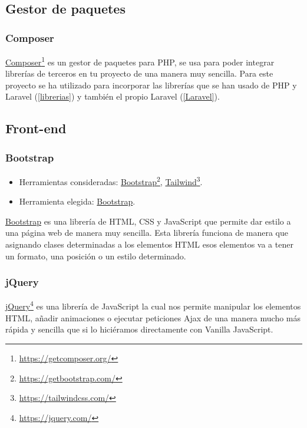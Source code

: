 \subsection{Gestor de paquetes}

\subsubsection{Composer}

\href{https://getcomposer.org/}{Composer}\footnote{\href{https://getcomposer.org/}{https://getcomposer.org/}} es un gestor de paquetes para PHP, se usa para poder integrar librerías de terceros en tu proyecto de una manera muy sencilla. Para este proyecto se ha utilizado para incorporar las librerías que se han usado de PHP y Laravel (\ref{librerias}) y también el propio Laravel (\ref{Laravel}).

\subsection{Front-end}

\subsubsection{Bootstrap}
\begin{itemize}
    \item Herramientas consideradas: \href{https://getbootstrap.com/}{Bootstrap}\footnote{\label{bootstrapfoot}\href{https://getbootstrap.com/}{https://getbootstrap.com/}}, \href{https://tailwindcss.com/}{Tailwind}\footnote{\href{https://tailwindcss.com/}{https://tailwindcss.com/}}.
	\item Herramienta elegida: \href{https://getbootstrap.com/}{Bootstrap}.
\end{itemize}

\href{https://getbootstrap.com/}{Bootstrap} es una librería de HTML, CSS y JavaScript que permite dar estilo a una página web de manera muy sencilla. Esta librería funciona de manera que asignando clases determinadas a los elementos HTML esos elementos va a tener un formato, una posición o un estilo determinado.

\subsubsection{jQuery}

\href{https://jquery.com/}{jQuery}\footnote{\href{https://jquery.com/}{https://jquery.com/}} es una librería de JavaScript la cual nos permite manipular los elementos HTML, añadir animaciones o ejecutar peticiones Ajax de una manera mucho más rápida y sencilla que si lo hiciéramos directamente con Vanilla JavaScript. 

